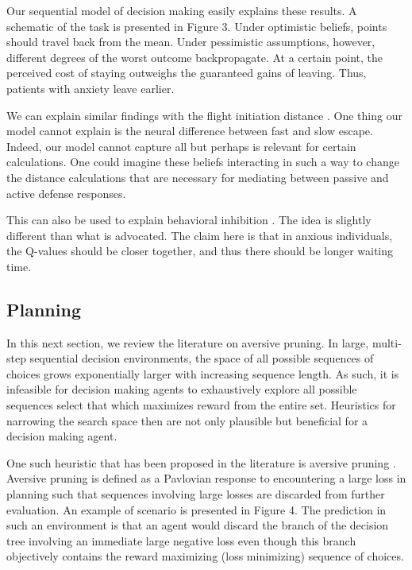 \documentclass[11pt]{article} %
\begin{document}
Our sequential model of decision making easily explains these results. A schematic of the task is presented in Figure 3. Under optimistic beliefs, points should travel back from the mean. Under pessimistic assumptions, however, different degrees of the worst outcome backpropagate. At a certain point, the perceived cost of staying outweighs the guaranteed gains of leaving. Thus, patients with anxiety leave earlier.

We can explain similar findings with the flight initiation distance \citep{Mobbs2018, Mobbs2019}. One thing our model cannot explain is the neural difference between fast and slow escape. Indeed, our model cannot capture all but perhaps is relevant for certain calculations. One could imagine these beliefs interacting in such a way to change the distance calculations that are necessary for mediating between passive and active defense responses.

This can also be used to explain behavioral inhibition \citep{bach2015, khemka2017}. The idea is slightly different than what is advocated. The claim here is that in anxious individuals, the Q-values should be closer together, and thus there should be longer waiting time.

\subsection{Planning}

In this next section, we review the literature on aversive pruning. In large, multi-step sequential decision environments, the space of all possible sequences of choices grows exponentially larger with increasing sequence length. As such, it is infeasible for decision making agents to exhaustively explore all possible sequences select that which maximizes reward from the entire set. Heuristics for narrowing the search space then are not only plausible but beneficial for a decision making agent.

One such heuristic that has been proposed in the literature is aversive pruning \citep{Huys2012}. Aversive pruning is defined as a Pavlovian response to encountering a large loss in planning such that sequences involving large losses are discarded from further evaluation. An example of scenario is presented in Figure 4. The prediction in such an environment is that an agent would discard the branch of the decision tree involving an immediate large negative loss even though this branch objectively contains the reward maximizing (loss minimizing) sequence of choices.
\end{document}
